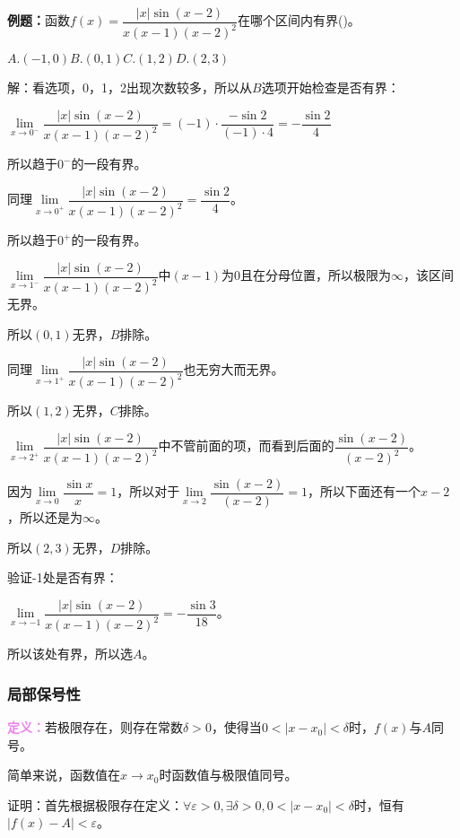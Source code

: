 \documentclass[UTF8, 12pt]{ctexart}
\begin{document}
\textbf{例题：}函数$f(x)=\dfrac{\vert x\vert\sin(x-2)}{x(x-1)(x-2)^2}$在哪个区间内有界()。\medskip

$A.(-1,0)$\qquad$B.(0,1)$\qquad$C.(1,2)$\qquad$D.(2,3)$\medskip

解：看选项，0，1，2出现次数较多，所以从$B$选项开始检查是否有界：\medskip

$\lim\limits_{x\to 0^-}\dfrac{\vert x\vert\sin(x-2)}{x(x-1)(x-2)^2}=(-1)\cdot\dfrac{-\sin 2}{(-1)\cdot 4}=-\dfrac{\sin 2}{4}$\medskip

所以趋于$0^-$的一段有界。\medskip

同理$\lim\limits_{x\to 0^+}\dfrac{\vert x\vert\sin(x-2)}{x(x-1)(x-2)^2}=\dfrac{\sin 2}{4}$。\medskip

所以趋于$0^+$的一段有界。\medskip

$\lim\limits_{x\to 1^-}\dfrac{\vert x\vert\sin(x-2)}{x(x-1)(x-2)^2}$中$(x-1)$为0且在分母位置，所以极限为$\infty$，该区间无界。\medskip

所以$(0,1)$无界，$B$排除。\medskip

同理$\lim\limits_{x\to 1^+}\dfrac{\vert x\vert\sin(x-2)}{x(x-1)(x-2)^2}$也无穷大而无界。\medskip

所以$(1,2)$无界，$C$排除。\medskip

$\lim\limits_{x\to 2^+}\dfrac{\vert x\vert\sin(x-2)}{x(x-1)(x-2)^2}$中不管前面的项，而看到后面的$\dfrac{\sin(x-2)}{(x-2)^2}$。\medskip

因为$\lim\limits_{x\to 0}\dfrac{\sin x}{x}=1$，所以对于$\lim\limits_{x\to 2}\dfrac{\sin(x-2)}{(x-2)}=1$，所以下面还有一个$x-2$，所以还是为$\infty$。

所以$(2,3)$无界，$D$排除。\medskip

验证-1处是否有界：\medskip

$\lim\limits_{x\to -1}\dfrac{\vert x\vert\sin(x-2)}{x(x-1)(x-2)^2}=-\dfrac{\sin 3}{18}$。\medskip

所以该处有界，所以选$A$。

\subsubsection{局部保号性}

\textcolor{violet}{\textbf{定义：}}若极限存在，则存在常数$\delta>0$，使得当$0<\vert x-x_0\vert<\delta$时，$f(x)$与$A$同号。

简单来说，函数值在$x\to x_0$时函数值与极限值同号。

证明：首先根据极限存在定义：$\forall\varepsilon>0,\exists\delta>0,0<\vert x-x_0\vert<\delta$时，恒有$\vert f(x)-A\vert<\varepsilon$。
\end{document}
